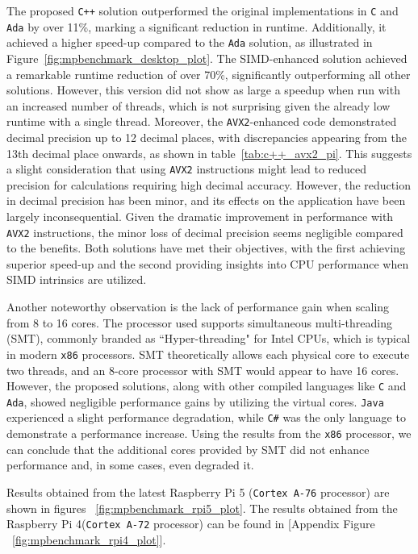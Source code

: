 The proposed \texttt{C++} solution outperformed the original implementations in \texttt{C} and \texttt{Ada} by over 11\%, marking a significant reduction in runtime. Additionally, it achieved a higher speed-up compared to the \texttt{Ada} solution, as illustrated in Figure~\ref{fig:mpbenchmark_desktop_plot}. The SIMD-enhanced solution achieved a remarkable runtime reduction of over 70\%, significantly outperforming all other solutions. However, this version did not show as large a speedup when run with an increased number of threads, which is not surprising given the already low runtime with a single thread. Moreover, the \texttt{AVX2}-enhanced code demonstrated decimal precision up to 12 decimal places, with discrepancies appearing from the 13th decimal place onwards, as shown in table~\ref{tab:c++_avx2_pi}. This suggests a slight consideration that using \texttt{AVX2} instructions might lead to reduced precision for calculations requiring high decimal accuracy. However, the reduction in decimal precision has been minor, and its effects on the application have been largely inconsequential. Given the dramatic improvement in performance with \texttt{AVX2} instructions, the minor loss of decimal precision seems negligible compared to the benefits. Both solutions have met their objectives, with the first achieving superior speed-up and the second providing insights into CPU performance when SIMD intrinsics are utilized.

Another noteworthy observation is the lack of performance gain when scaling from 8 to 16 cores. The processor used supports simultaneous multi-threading (SMT), commonly branded as ``Hyper-threading" for Intel CPUs, which is typical in modern \texttt{x86} processors. SMT theoretically allows each physical core to execute two threads, and an 8-core processor with SMT would appear to have 16 cores. However, the proposed solutions, along with other compiled languages like \texttt{C} and \texttt{Ada}, showed negligible performance gains by utilizing the virtual cores. \texttt{Java} experienced a slight performance degradation, while \texttt{C\#} was the only language to demonstrate a performance increase. Using the results from the \texttt{x86} processor, we can conclude that the additional cores provided by SMT did not enhance performance and, in some cases, even degraded it.

Results obtained from the latest Raspberry Pi 5 (\texttt{Cortex A-76} processor) are shown in figures ~\ref{fig:mpbenchmark_rpi5_plot}. The results obtained from the Raspberry Pi 4(\texttt{Cortex A-72} processor) can be found in [Appendix Figure ~\ref{fig:mpbenchmark_rpi4_plot}].

